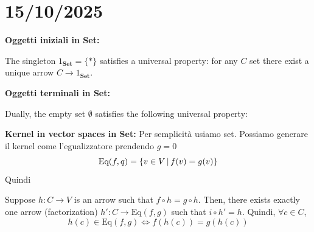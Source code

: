 \documentclass[a4paper]{article}
\begin{document}

\pagebreak

\section{15/10/2025}

\newcommand{\invPi}{\rotatebox[origin=c]{180}{$\pi$}}

\textbf{Oggetti iniziali in Set:}

The singleton \(1_\mathbf{Set} = \{\ast\}\) satisfies a universal property:
for any \(C\) set there exist a unique arrow \(C \to 1_\mathbf{Set}\).
\begin{center}
\end{center}

\textbf{Oggetti terminali in Set:}

Dually, the empty set \(\emptyset\) satisfies the following universal property:
\begin{center}
\end{center}

\textbf{Kernel in vector spaces in Set:}
Per semplicità usiamo set.
Possiamo generare il kernel come l'egualizzatore prendendo \(g=0\)
\[
    \text{Eq}(f,q) = \{v \in V \,|\, f(v) = g(v)\}
\]
Quindi 
Suppose \(h \colon C \to V\)
is an arrow such that \(f \circ h = g \circ h\).
Then, there exists exactly one arrow (factorization)
\(h' \colon C \to \text{Eq}(f,g)\)
such that \(i \circ h' = h\).
Quindi, \(\forall c \in C\),
\[
    h(c) \in \text{Eq}(f,g) \iff f(h(c)) = g(h(c))
\]
\end{document}
